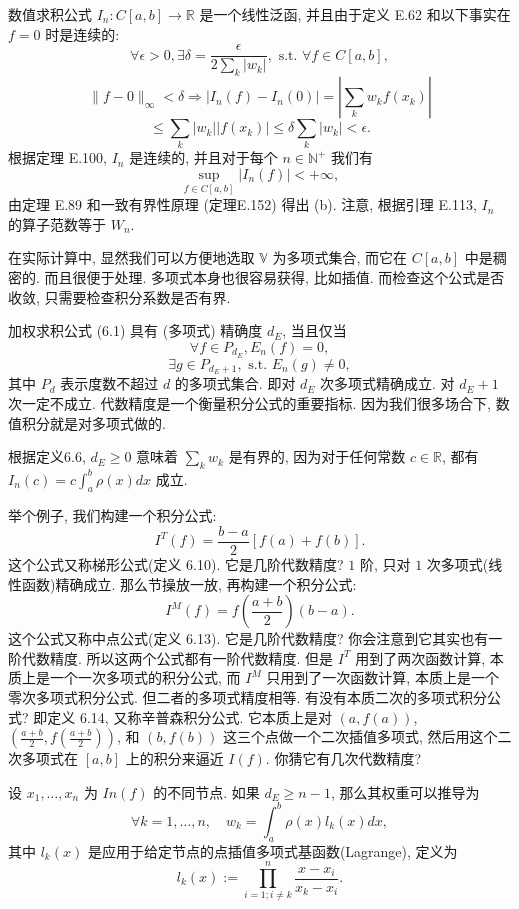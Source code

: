 \documentclass[a4paper]{ctexart}
\newcommand{\hl}[1]
{\noindent {\bf {#1}}}
\begin{document}
{数值求积公式 $I_n : C[a, b] \rightarrow \mathbb{R}$ 是一个线性泛函, 并且由于定义 E.62 和以下事实在 $f = 0$ 
时是连续的:
\[ 
\forall \epsilon > 0, \exists \delta = \frac{\epsilon}{2 \sum_k |w_k|}, 
\text{ s.t. } \forall f \in C[a, b], 
\]
\[ 
\|f - 0\|_{\infty} < \delta \Rightarrow |I_n(f) - I_n(0)| = \left| \sum_k w_k f(x_k) \right|
\]
\[ 
\leq \sum_k |w_k| |f(x_k)| \leq \delta \sum_k |w_k| < \epsilon. 
\]
根据定理 E.100, $I_n$ 是连续的, 并且对于每个 $n \in \mathbb{N}^+$ 我们有
\[ 
\sup_{f \in C[a, b]} |I_n(f)| < +\infty, 
\]
由定理 E.89 和一致有界性原理 (定理E.152) 得出 (b). 注意, 根据引理 E.113, $I_n$ 的算子范数等于 $W_n$.

在实际计算中, 显然我们可以方便地选取 $\mathbb{V}$ 为多项式集合, 而它在 $C[a, b]$ 中是稠密的. 而且很便于处理. 
多项式本身也很容易获得, 比如插值. 而检查这个公式是否收敛, 只需要检查积分系数是否有界. 

\hl{定义6.6} 加权求积公式 (6.1) 具有 (多项式) 精确度 $d_E$, 当且仅当
\[ 
\forall f \in P_{d_E}, E_n(f) = 0, 
\]
\[ 
\exists g \in P_{d_E+1}, \text{ s.t. } E_n(g) \neq 0, 
\]
其中 $P_d$ 表示度数不超过 $d$ 的多项式集合. 即对 $d_E$ 次多项式精确成立. 对 $d_E + 1$ 次一定不成立. 
代数精度是一个衡量积分公式的重要指标. 因为我们很多场合下, 数值积分就是对多项式做的.

\hl{例6.7} 根据定义6.6, $d_E \geq 0$ 意味着 $\sum_k w_k$ 是有界的, 
因为对于任何常数 $c \in \mathbb{R}$, 都有 $I_n(c) = c \int_{a}^{b} \rho(x)dx$ 成立.

举个例子, 我们构建一个积分公式:
$$
I^T(f) = \frac{b - a}{2} [f(a) + f(b)].
$$
这个公式又称梯形公式(定义 6.10). 它是几阶代数精度? 
$1$ 阶, 只对 $1$ 次多项式(线性函数)精确成立. 
那么节操放一放, 再构建一个积分公式:
$$
I^M(f) = f(\frac{a + b}{2})(b - a).
$$
这个公式又称中点公式(定义 6.13). 它是几阶代数精度? 你会注意到它其实也有一阶代数精度. 
所以这两个公式都有一阶代数精度. 
但是 $I^T$ 用到了两次函数计算, 本质上是一个一次多项式的积分公式, 而 $I^M$ 只用到了一次函数计算, 
本质上是一个零次多项式积分公式. 但二者的多项式精度相等. 
有没有本质二次的多项式积分公式? 即定义 6.14, 又称辛普森积分公式. 它本质上是对 $(a, f(a))$, 
$\left(\frac{a + b}{2}, f\left(\frac{a + b}{2}\right)\right)$, 和 $(b, f(b))$ 这三个点做一个二次插值多项式,
然后用这个二次多项式在 $[a, b]$ 上的积分来逼近 $I(f)$. 你猜它有几次代数精度?

\hl{引理6.8} 设 $x_1, \ldots, x_n$ 为 $In(f)$ 的不同节点. 如果 $d_E \geq n - 1$, 
那么其权重可以推导为
\[ 
\forall k = 1, \ldots, n, \quad w_k = \int_{a}^{b} \rho(x)l_k(x)dx, 
\]
其中 $l_k(x)$ 是应用于给定节点的点插值多项式基函数(Lagrange), 定义为
\[ 
l_k(x) := \prod_{i=1;i \neq k}^{n} \frac{x - x_i}{x_k - x_i}. 
\]

}
\end{document}
